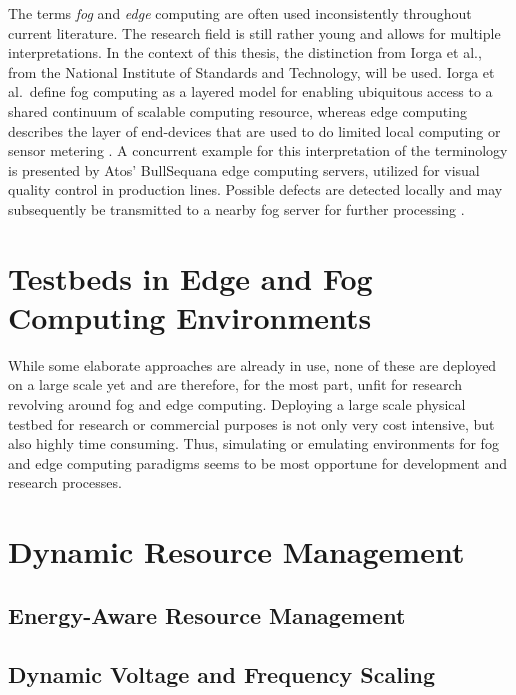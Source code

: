 The terms \emph{fog} and \emph{edge} computing are often used inconsistently
throughout current literature. The research field is still rather young and
allows for multiple interpretations. In the context of this thesis, the
distinction from Iorga et al., from the National Institute of Standards and
Technology, will be used. Iorga et al.\ define fog computing as a layered model
for enabling ubiquitous access to a shared continuum of scalable computing
resource, whereas edge computing describes the layer of end-devices that are
used to do limited local computing or sensor metering \cite{iorga2018}. A
concurrent example for this interpretation of the terminology is presented by
Atos' BullSequana edge computing servers, utilized for visual quality control in
production lines. Possible defects are detected locally and may subsequently be
transmitted to a nearby fog server for further processing \cite{atos2020}.

\section{Testbeds in Edge and Fog Computing Environments}
\label{sec:testbeds_in_edge_and_fog_computing_environments}

While some elaborate approaches are already in use, none of these are deployed
on a large scale yet and are therefore, for the most part, unfit for research
revolving around fog and edge computing. Deploying a large scale physical
testbed for research or commercial purposes is not only very cost intensive, but
also highly time consuming. Thus, simulating or emulating environments for fog
and edge computing paradigms seems to be most opportune for development and
research processes.

\section{Dynamic Resource Management}
\label{sec:dynamic_resource_management}

\subsection{Energy-Aware Resource Management}
\label{sec:energy-aware_resource_management}

\subsection{Dynamic Voltage and Frequency Scaling}
\label{sec:dynamic_voltage_and_frequency_scaling}


